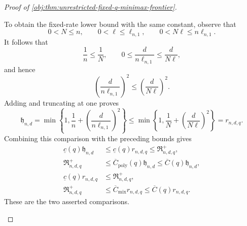 \documentclass[11pt]{article}
\begin{document}
\begin{proof}[Proof of \cref{obj:thm:unrestricted-fixed-q-minimax-frontier}]
\begin{enumerate}
To obtain the fixed-rate lower bound with the same constant, observe that
\[
0<N\le n,
\qquad
0<\ell\le\ell_{n,1},
\qquad
0<N\ell\le n\ell_{n,1}.
\]
It follows that
\[
\frac1n\le\frac1N,
\qquad
0\le\frac{d}{n\ell_{n,1}}\le\frac{d}{N\ell},
\]
and hence
\[
\left(\frac{d}{n\ell_{n,1}}\right)^2
\le
\left(\frac{d}{N\ell}\right)^2.
\]
Adding and truncating at one proves
\[
\mathfrak h_{n,d}
=
\min\left\{1,\frac1n+
\left(\frac{d}{n\ell_{n,1}}\right)^2\right\}
\le
\min\left\{1,\frac1N+
\left(\frac{d}{N\ell}\right)^2\right\}
=r_{n,d,q}.
\]
Combining this comparison with the preceding bounds gives
\[
\begin{aligned}
\underline c(q)\mathfrak h_{n,d}
&\le \underline c(q)r_{n,d,q}
 \le\mathfrak R^+_{n,d,q},\\
\mathfrak R^+_{n,d,q}
&\le\overline C_{\mathrm{poly}}(q)\mathfrak h_{n,d}
 \le\overline C(q)\mathfrak h_{n,d},\\
\underline c(q)r_{n,d,q}
&\le\mathfrak R^+_{n,d,q},\\
\mathfrak R^+_{n,d,q}
&\le\overline C_{\mathrm{mix}}r_{n,d,q}
 \le\overline C(q)r_{n,d,q}.
\end{aligned}
\]
These are the two asserted comparisons.
\end{enumerate}
\end{proof}
\end{document}
